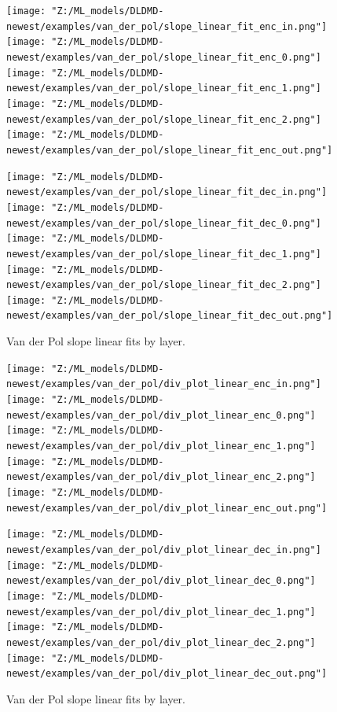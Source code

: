 \begin{figure}[h!p]
    \centering
    \begin{minipage}{.5\textwidth}
        \texttt{[image: "Z:/ML\_models/DLDMD-newest/examples/van\_der\_pol/slope\_linear\_fit\_enc\_in.png"]} 
        \texttt{[image: "Z:/ML\_models/DLDMD-newest/examples/van\_der\_pol/slope\_linear\_fit\_enc\_0.png"]} 
        \texttt{[image: "Z:/ML\_models/DLDMD-newest/examples/van\_der\_pol/slope\_linear\_fit\_enc\_1.png"]} 
        \texttt{[image: "Z:/ML\_models/DLDMD-newest/examples/van\_der\_pol/slope\_linear\_fit\_enc\_2.png"]} 
        \texttt{[image: "Z:/ML\_models/DLDMD-newest/examples/van\_der\_pol/slope\_linear\_fit\_enc\_out.png"]} 
    \end{minipage}%
    \begin{minipage}{.5\textwidth}
        \texttt{[image: "Z:/ML\_models/DLDMD-newest/examples/van\_der\_pol/slope\_linear\_fit\_dec\_in.png"]} 
        \texttt{[image: "Z:/ML\_models/DLDMD-newest/examples/van\_der\_pol/slope\_linear\_fit\_dec\_0.png"]} 
        \texttt{[image: "Z:/ML\_models/DLDMD-newest/examples/van\_der\_pol/slope\_linear\_fit\_dec\_1.png"]} 
        \texttt{[image: "Z:/ML\_models/DLDMD-newest/examples/van\_der\_pol/slope\_linear\_fit\_dec\_2.png"]} 
        \texttt{[image: "Z:/ML\_models/DLDMD-newest/examples/van\_der\_pol/slope\_linear\_fit\_dec\_out.png"]} 
    \end{minipage}
    \caption{Van der Pol slope linear fits by layer.}
    \label{fig:van der pol slopes all layers}
\end{figure}

\begin{figure}[h!p]
    \centering
    \begin{minipage}{.5\textwidth}
        \texttt{[image: "Z:/ML\_models/DLDMD-newest/examples/van\_der\_pol/div\_plot\_linear\_enc\_in.png"]} 
        \texttt{[image: "Z:/ML\_models/DLDMD-newest/examples/van\_der\_pol/div\_plot\_linear\_enc\_0.png"]} 
        \texttt{[image: "Z:/ML\_models/DLDMD-newest/examples/van\_der\_pol/div\_plot\_linear\_enc\_1.png"]} 
        \texttt{[image: "Z:/ML\_models/DLDMD-newest/examples/van\_der\_pol/div\_plot\_linear\_enc\_2.png"]} 
        \texttt{[image: "Z:/ML\_models/DLDMD-newest/examples/van\_der\_pol/div\_plot\_linear\_enc\_out.png"]} 
    \end{minipage}%
    \begin{minipage}{.5\textwidth}
        \texttt{[image: "Z:/ML\_models/DLDMD-newest/examples/van\_der\_pol/div\_plot\_linear\_dec\_in.png"]} 
        \texttt{[image: "Z:/ML\_models/DLDMD-newest/examples/van\_der\_pol/div\_plot\_linear\_dec\_0.png"]} 
        \texttt{[image: "Z:/ML\_models/DLDMD-newest/examples/van\_der\_pol/div\_plot\_linear\_dec\_1.png"]} 
        \texttt{[image: "Z:/ML\_models/DLDMD-newest/examples/van\_der\_pol/div\_plot\_linear\_dec\_2.png"]} 
        \texttt{[image: "Z:/ML\_models/DLDMD-newest/examples/van\_der\_pol/div\_plot\_linear\_dec\_out.png"]} 
    \end{minipage}
    \caption{Van der Pol slope linear fits by layer.}
    \label{fig:van der pol linear fits all layers}
\end{figure}


